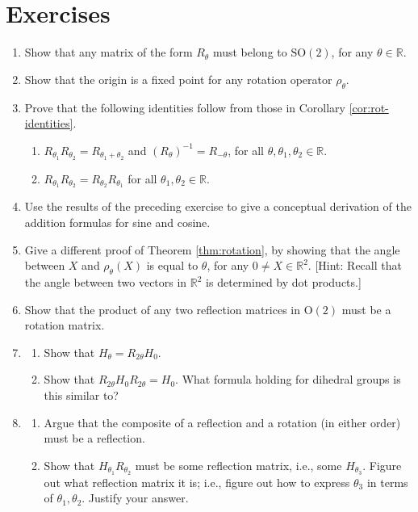 \documentclass[11pt]{article}
\newenvironment{problems}
{
 \begin{enumerate}[topsep=1pt,itemsep=0pt,parsep=2pt,%
 label={\arabic*.}, ref=\arabic*] \small
}
{
 \end{enumerate}
}
\theoremstyle{definition}
\newcommand{\R}{\mathbb{R}} %
\newcommand{\Orth}{\mathrm{O}}
\newcommand{\SO}{\mathrm{SO}}
\begin{document}
\section*{Exercises}
\begin{problems}
\item Show that any matrix of the form $R_\theta$ must belong to
  $\SO(2)$, for any $\theta \in \R$.

\item Show that the origin is a fixed point for any rotation operator
  $\rho_\theta$.

\item Prove that the following identities follow from those in
  Corollary \ref{cor:rot-identities}.
  \begin{enumerate}
  \item $R_{\theta_1} R_{\theta_2} = R_{\theta_1+\theta_2}$
    and $(R_\theta)^{-1} = R_{-\theta}$, for all $\theta, \theta_1,
    \theta_2 \in \R$.
  \item $R_{\theta_1} R_{\theta_2} = R_{\theta_2} R_{\theta_1}$ for
    all $\theta_1, \theta_2 \in \R$.
  \end{enumerate}

\item Use the results of the preceding exercise to give a conceptual
  derivation of the addition formulas for sine and cosine.

\item Give a different proof of Theorem \ref{thm:rotation}, by showing
  that the angle between $X$ and $\rho_\theta(X)$ is equal to
  $\theta$, for any $0 \ne X\in \R^2$. [Hint: Recall that the angle
    between two vectors in $\R^2$ is determined by dot products.]

\item Show that the product of any two reflection matrices in
  $\Orth(2)$ must be a rotation matrix.

\item 
  \begin{enumerate}
  \item Show that $H_\theta = R_{2\theta} H_0$.
  \item Show that $R_{2\theta} H_0 R_{2\theta} = H_0$. What formula
    holding for dihedral groups is this similar to?
  \end{enumerate}

\item 
  \begin{enumerate}
  \item Argue that the composite of a reflection and a rotation (in
    either order) must be a reflection.
  \item Show that $H_{\theta_1} R_{\theta_2}$ must be some reflection
    matrix, i.e., some $H_{\theta_3}$. Figure out what reflection
    matrix it is; i.e., figure out how to express $\theta_3$ in terms
    of $\theta_1, \theta_2$. Justify your answer.
  \end{enumerate}

\end{problems}
\end{document}
